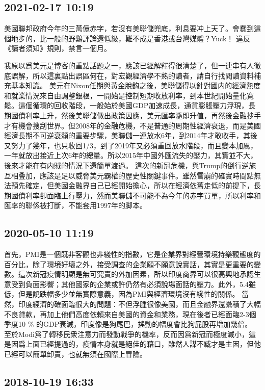 \documentclass[twocolumn]{ctexart}
\begin{document}
\subsection*{2021-02-17 10:19}

美國聯邦政府今年的三萬億赤字，若沒有美聯儲兜底，利息要冲上天了。會蠢到這個地步的，比一般的野鷄評論還低級，難不成是香港或台灣媒體？Yuck！
違反《讀者須知》規則，禁言一個月。

我原以爲美元是博客的重點話題之一，應該已經解釋得很清楚了，但一連串有人徹底誤解，所以這裏點出誤區何在，對宏觀經濟學不熟的讀者，請自行找閲讀資料補充基本知識。
美元在Nixon任期與黃金脫鈎之後，美聯儲得以針對國内的經濟熱度和就業情況來自由調整銀根，一開始是控制短期收放利率，到本世紀開始量化寬鬆。這個循環的回收階段，一般始於美國GDP加速成長，通貨膨脹壓力浮現，長期國債利率上升，然後美聯儲做出政策因應，美元匯率隨即升值，再然後金融抄手才有機會搜刮世界。但2008年的金融危機，不是普通的周期性經濟衰退，而是美國經濟長期不可逆衰頹的重要步驟，美聯儲一連放水6年，到2014年才敢收手，其後又努力了幾年，也只收回1/3，到了2019年又必須重回放水階段，而且變本加厲，一年就放出接近上次6年的總量。所以2015年中國外匯流失的壓力，其實並不大，後來才能在有内賊的情況下還簡單渡過。
這次的新冠危機，與Trump的倒行逆施互相叠加，應該是足以威脅美元霸權的歷史性關鍵事件。雖然雪崩的確實時間點無法預先確定，但美國金融界自己已經開始擔心，所以在經濟依舊走低的前提下，長期國債利率卻面臨上行壓力，然而美聯儲不可能不為今年的赤字買單，所以利率和匯率的聯係被打斷，不能套用1997年的脚本。
\subsection*{2020-05-10 11:19}

首先，PMI是一個既非客觀也非綫性的指數，它是企業界對經營環境持樂觀態度的百分比，除了環境好壞之外，接受調查的企業願不願意說實話，其實是更重要的變數。這次新冠疫情明顯是無可究責的外加因素，所以印度商界可以很高興地承認生意受到負面影響；其他國家的企業或許仍然有必須說場面話的壓力。此外，5.4雖低，但是說跌幅多少並無實際意義，因為PMI與經濟環境沒有綫性的關係。 
當然，印度經濟的確面臨很大的問題：不但浮腫很像美國，而且金融界還纍積了大幅不良貸款，再加上他們高度依賴來自美國的資金和業務，現在後者已經面臨2-3個季度10 \% 的GDP衰減，印度像是狗尾巴，搖動的幅度會比狗屁股再增加幾倍。 
至於Modi爲了轉移民衆注意力而發動戰爭的機率，反而因爲新冠而極度減小，這是因爲上面已經提過的，疫情本身就是絕佳的藉口，雖然人謀不臧才是主因，但他已經可以簡單卸責，也就無須在國際上冒險。
\subsection*{2018-10-19 16:33}
\end{document}
